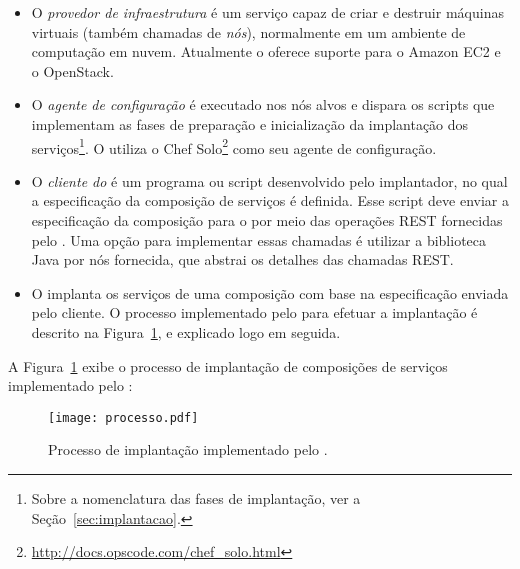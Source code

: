 \begin{itemize}

\item O \emph{provedor de infraestrutura} é um serviço capaz de criar e destruir máquinas virtuais 
(também chamadas de \emph{nós}), normalmente em um ambiente de computação em nuvem. 
Atualmente o \ee oferece suporte para o Amazon EC2 e o OpenStack.

\item O \emph{agente de configuração} é executado nos nós alvos
e dispara os scripts que implementam as fases de preparação
e inicialização da implantação dos serviços\footnote{Sobre a nomenclatura das fases de implantação, ver a Seção~\ref{sec:implantacao}.}.
O \ee utiliza o Chef Solo\footnote{\url{http://docs.opscode.com/chef_solo.html}}
como seu agente de configuração.

\item O \emph{cliente do \ee} é um programa ou script desenvolvido
pelo implantador, no qual a especificação da composição de serviços é definida.
Esse script deve enviar a especificação da composição para o \ee
por meio das operações REST fornecidas pelo \ee.
Uma opção para implementar essas chamadas é utilizar
a biblioteca Java por nós fornecida, que abstrai os detalhes
das chamadas REST.

\item O \emph{\ee} implanta os serviços de uma composição
com base na especificação enviada pelo cliente.
O processo implementado pelo \ee para efetuar a implantação
é descrito na Figura~\ref{fig:processo}, e explicado logo em seguida. 

\end{itemize} 

A Figura~\ref{fig:processo} exibe o processo de implantação de composições
de serviços implementado pelo \ee:

\begin{figure}[ht]
\centering
\texttt{[image: processo.pdf]}
\caption{Processo de implantação implementado pelo \ee.}
\label{fig:processo}
\end{figure}

